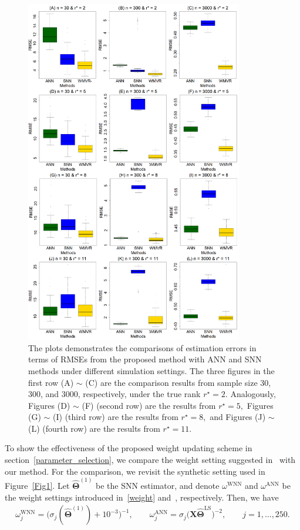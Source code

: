 \documentclass[alpha-refs]{wiley-article}
\begin{document}
\begin{figure}[htbp!]
\includegraphics[width=95mm]{Figure/S5_P1.pdf}
\centering
\caption{The plots demonstrates the comparisons of estimation errors in terms of RMSEs from the proposed method with ANN and SNN methods under different simulation settings.
The three figures in the first row (A) $\sim$ (C) are the comparison results from sample size 30, 300, and 3000, respectively, under the true rank $r^{\star} = 2$.
Analogously, Figures (D) $\sim$ (F) (second row) are the results from $r^{\star} = 5,$ Figures (G) $\sim$ (I) (third row) are the results from $r^{\star} = 8,$ and Figures (J) $\sim$ (L) (fourth row) are the results from $r^{\star} = 11.$  }
\label{Fig_S4_Ex1}
\end{figure}

To show the effectiveness of the proposed weight updating scheme in section~\ref{parameter_selection},
we compare the weight setting suggested in~\citet{chen2013reduced} with our method.
For the comparison, we revisit the synthetic setting used in Figure~\ref{Fig1}.
Let $\widehat{\boldsymbol{\Theta}}^{(1)}$ be the SNN estimator, and denote $\omega^{\text{WNN}}$
and $\omega^{\text{ANN}}$ be the weight settings introduced in~\eqref{weight} and~\citet{chen2013reduced}, respectively.
Then, we have
\begin{align} \label{weight_comp}
    \omega_{j}^{\text{WNN}} =
    \big(\sigma_{j}(\widehat{\boldsymbol{\Theta}}^{(1)})+10^{-3}\big)^{-1},
    \qquad
    \omega_{j}^{\text{ANN}} =
    \sigma_{j}\big( \boldsymbol{X}\widehat{\boldsymbol{\Theta}}^{\text{LS}} \big)^{-2},
    \qquad j=1,\dots,250.
\end{align}
\end{document}
